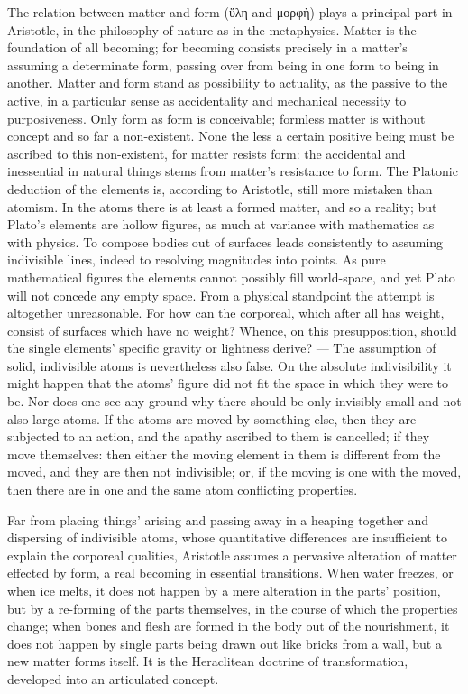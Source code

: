 \documentclass[12pt,a4paper]{book}
\begin{document}
The relation between matter and form (ὕλη and μορφὴ) plays a principal part in Aristotle, in the philosophy of
nature as in the metaphysics. Matter is the foundation of all becoming; for becoming consists precisely in a
matter's assuming a determinate form, passing over from being in one form to being in another. Matter and form
stand as possibility to actuality, as the passive to the active, in a particular sense as accidentality and
mechanical necessity to purposiveness. Only form as form is conceivable; formless matter is without concept
and so far a non-existent. None the less a certain positive being must be ascribed to this non-existent, for
matter resists form: the accidental and inessential in natural things stems from matter's resistance to form.
The Platonic deduction of the elements is, according to Aristotle, still more mistaken than atomism. In the
atoms there is at least a formed matter, and so a reality; but Plato's elements are hollow figures, as much at
variance with mathematics as with physics. To compose bodies out of surfaces leads consistently to assuming
indivisible lines, indeed to resolving magnitudes into points. As pure mathematical figures the elements
cannot possibly fill world-space, and yet Plato will not concede any empty space. From a physical standpoint
the attempt is altogether unreasonable. For how can the corporeal, which after all has weight, consist of
surfaces which have no weight? Whence, on this presupposition, should the single elements' specific gravity or
lightness derive? --- The assumption of solid, indivisible atoms is
nevertheless also false. On the absolute indivisibility it might happen that the atoms' figure did not fit the
space in which they were to be. Nor does one see any ground why there should be only invisibly small and not
also large atoms. If the atoms are moved by something else, then they are subjected to an action, and the
apathy ascribed to them is cancelled;
if they move themselves: then either the moving element in them is different from the moved, and they are then
not indivisible; or, if the moving is one with the moved, then there are in one and the same atom conflicting
properties.

Far from placing things' arising and passing away in a heaping together and dispersing of indivisible atoms,
whose quantitative differences are insufficient to explain the corporeal qualities, Aristotle assumes a
pervasive alteration of matter effected by form, a real becoming in essential transitions. When water freezes,
or when ice melts, it does not happen by a mere alteration in the parts' position, but by a re-forming of the
parts themselves, in the course of which the properties change; when bones and flesh are formed in the body
out of the nourishment, it does not happen by single parts being drawn out like bricks from a wall, but a new
matter forms itself. It is the Heraclitean doctrine of transformation, developed into an articulated concept.
\end{document}
